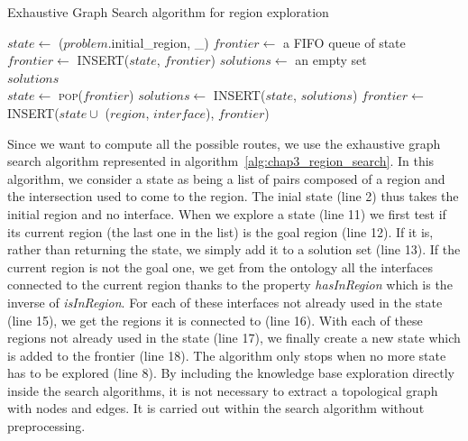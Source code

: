 \begin{algorithm}[!htbp]
\caption{Exhaustive Graph Search algorithm for region exploration}
\label{alg:chap3_region_search}
\begin{algorithmic}[1]
	\State $state \leftarrow$ ($problem$.initial\_region, \_) 
    \State $frontier\leftarrow$ a FIFO queue of state
    \State $frontier\leftarrow$ \textsc{INSERT}($state$, $frontier$)
    \State $solutions\leftarrow$ an empty set
    \\
    \Loop
        	\State \Return $solutions$
        \EndIf
        \\
        \State $state\leftarrow$ \textsc{pop}($frontier$)
        	\State $solutions\leftarrow$ \textsc{INSERT}($state$, $solutions$)
        \Else
        				\State $frontier\leftarrow$ \textsc{INSERT}($state \cup$ ($region$, $interface$), $frontier$)
        			\EndIf
        		\EndFor
        	\EndFor
        \EndIf
    \EndLoop
\EndFunction
\end{algorithmic}
\end{algorithm}

Since we want to compute all the possible routes, we use the exhaustive graph search algorithm represented in algorithm~\ref{alg:chap3_region_search}. In this algorithm, we consider a state as being a list of pairs composed of a region and the intersection used to come to the region. The inial state (line 2) thus takes the initial region and no interface. When we explore a state (line 11) we first test if its current region (the last one in the list) is the goal region (line 12). If it is, rather than returning the state, we simply add it to a solution set (line 13). If the current region is not the goal one, we get from the ontology all the interfaces connected to the current region thanks to the property \textit{hasInRegion} which is the inverse of \textit{isInRegion}. For each of these interfaces not already used in the state (line 15), we get the regions it is connected to (line 16). With each of these regions not already used in the state (line 17), we finally create a new state which is added to the frontier (line 18). The algorithm only stops when no more state has to be explored (line 8). By including the knowledge base exploration directly inside the search algorithms, it is not necessary to extract a topological graph with nodes and edges. It is carried out within the search algorithm without preprocessing.

